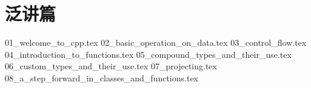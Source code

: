 \part*{泛讲篇}
{01_welcome_to_cpp.tex}
{02_basic_operation_on_data.tex}
{03_control_flow.tex}
{04_introduction_to_functions.tex}
{05_compound_types_and_their_use.tex}
{06_custom_types_and_their_use.tex}
{07_projecting.tex}
{08_a_step_forward_in_classes_and_functions.tex}